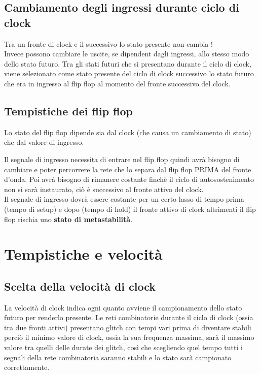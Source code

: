 \documentclass[a4paper]{book}
\begin{document}
\subsection*{Cambiamento degli ingressi durante ciclo di clock}

Tra un fronte di clock e il successivo lo stato presente non cambia !\\Invece possono cambiare le uscite, se dipendent dagli ingressi, allo stesso modo dello stato futuro.
Tra gli stati futuri che si presentano durante il ciclo di clock, viene selezionato come stato presente del ciclo di clock successivo lo stato futuro che era in ingresso al flip flop al momento del fronte successivo del clock.


\subsection{Tempistiche dei flip flop}

Lo stato del flip flop dipende sia dal clock (che causa un cambiamento di stato) che dal valore di ingresso.

Il segnale di ingresso necessita di entrare nel flip flop quindi avrà bisogno di cambiare e poter percorrere la rete che lo separa dal flip flop PRIMA del fronte d'onda.
Poi avrà bisogno di rimanere costante finchè il ciclo di autosostenimento non si sarà instaurato, ciò è successivo al fronte attivo del clock.\\
Il segnale di ingresso dovrà essere costante per un certo lasso di tempo prima (tempo di setup) e dopo (tempo di hold) il fronte attivo di clock altrimenti il flip flop rischia uno \textbf{stato di metastabilità}.


\section{Tempistiche e velocità}
\subsection*{Scelta della velocità di clock}

La velocità di clock indica ogni quanto avviene il campionamento dello stato futuro per renderlo presente.
Le reti combinatorie durante il ciclo di clock (ossia tra due fronti attivi) presentano glitch con tempi vari prima di diventare stabili perciò il minimo valore di clock, ossia la sua frequenza massima, sarà il massimo valore tra quelli delle durate dei glitch, così che scegliendo quel tempo tutti i segnali della rete combinatoria saranno stabili e lo stato sarà campionato correttamente.
\end{document}
